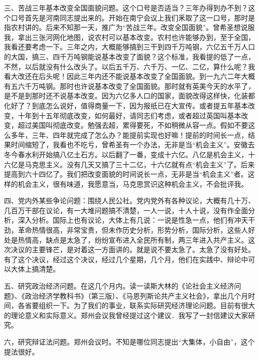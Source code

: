 三、苦战三年基本改变全国面貌问题。这个口号是否适当？三年办得到办不到？这个口号首先是河南同志提出来的。开始在南宁会议上我们釆取了这一口号，那时是指农村讲的。后来不知那一天，推广为“苦战三年。改变全国面貌”。曾希圣想说服我，拿出三张河网化地图，说农村可以基本改变。农村也许能够办到，至于全国，我看还要考虑一下。三年之内，大概能够搞到三干到四千万吨钢，六亿五千万人口的大国，搞三、四千万吨钢能说基本改变了面貌？这个标准，我看提的低了一点，不然，以后就没有什么改头了。以后五千万、六千万、一亿、二亿，算什么呢？我看大改还在后头呢！因此三年内还不能说基本改变了全国面貌。到一九六二年大概有五六千万吨钢。那时也许说基本改变了全国面貌。那时就有英美今天的水平了，是不是到那时还不说基本改变。因为六亿多人口的国家，面貌改得这样快，化装都化好了？到底怎么说好，值得商量一下，因为报纸已在大宣传。或者提五年基本改变，十年到十五年彻底改变，如何最好，请同志们考虑，或者超过英国叫基本改变，超过美国叫彻底改变。勉强去超，累得要死，不如稍微从容一点。假如不要这么多年，三年、四年就完成了怎么办？能提前实现也好嘛！提前的时间长一点，结果时间缩短了，我看也不吃亏，曾希圣有一个办法，无非是当“机会主义”。安徽去冬今春水利开始搞八亿土石方。以后翻了一番，变成十六亿。八亿是机会主义，十六亿是马克思主义。没有几天又搞了三十二亿，十六亿就有点“机会主义”了。后来提高到六十四亿了。我们把改变面貌的时间说长一点，无非是当“机会主义”者。这样的机会主义，很有味道，我愿意当，马克思赏识这种机会主义，不会批评我。

四、党内外某些争论问题：围绕人民公社。党内党外有各种议论，大概有几十万、几百万干部在议论，有一大堆问题搞不清楚，一人一说，十人十说，没有作全面分析，深入分析。国际上也有议论，大体上有几说：一说是性急一点，他们有冲天干劲，革命热情很高，非常宝贵，但未作历史分析，形势分析，国际分析，这些人好处是热情高，缺点是太急了，纷纷宣布进入全民所有制，两三年进入共产主义。这次决议的主要锋芒，是对着这一方面讲的。就是说不要太急了。太急了没有好处。有了这个决议，经过这个决议，经过几个星期，几个月，他们在实践中、辩论中可以大体上搞清楚。

五、研究政治经济问题。在这几个月内。读一读斯大林的《论社会主义经济问题》、《政治经济学教科书》（第三版）、《马恩列斯论共产主义社会》，拿出几个月时间，各省要组织一下。为了我们的事业，联系实际研究经济理论问题。目前有很大的理论意义和实际意义。郑州会议我曾经提过这个建议．我写了一封信建议大家研究。

六，研究辩证法问题。郑州会议时。不知是哪位同志提出“大集体，小自由”，这个提法很好。

